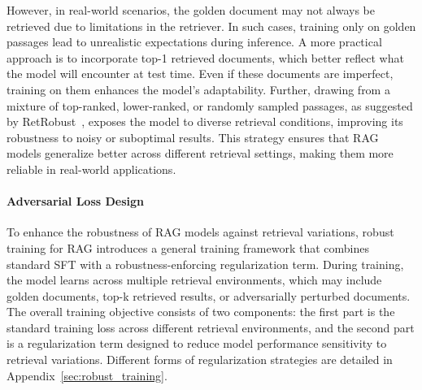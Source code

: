 However, in real-world scenarios, the golden document may not always be retrieved due to limitations in the retriever. In such cases, training only on golden passages lead to unrealistic expectations during inference. A more practical approach is to incorporate top-1 retrieved documents, which better reflect what the model will encounter at test time. Even if these documents are imperfect, training on them enhances the model’s adaptability. Further, drawing from a mixture of top-ranked, lower-ranked, or randomly sampled passages, as suggested by RetRobust~\cite{DBLP:conf/iclr/YoranWRB24}, exposes the model to diverse retrieval conditions, improving its robustness to noisy or suboptimal results. This strategy ensures that RAG models generalize better across different retrieval settings, making them more reliable in real-world applications.


\paragraph{Adversarial Loss Design}
To enhance the robustness of RAG models against retrieval variations, robust training for RAG introduces a general training framework that combines standard SFT with a robustness-enforcing regularization term. During training, the model learns across multiple retrieval environments, which may include golden documents, top-k retrieved results, or adversarially perturbed documents. The overall training objective consists of two components: the first part is the standard training loss across different retrieval environments, and the second part is a regularization term designed to reduce model performance sensitivity to retrieval variations. Different forms of regularization strategies are detailed in Appendix~\ref{sec:robust_training}.


